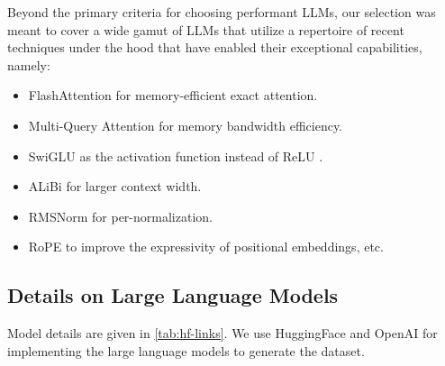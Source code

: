 Beyond the primary criteria for choosing performant LLMs, our selection was meant to cover a wide gamut of LLMs that utilize a repertoire of recent techniques under the hood that have enabled their exceptional capabilities, namely: 

\vspace{-2mm}
\begin{itemize}
[leftmargin=10mm]
\setlength\itemsep{0em}
\item FlashAttention \cite{dao2022flashattention} for memory-efficient exact attention.
\item Multi-Query Attention \cite{shazeer2019fast} for memory bandwidth efficiency.
\item SwiGLU \cite{shazeer2020glu} as the activation function instead of ReLU \cite{agarap2019deep}.
\item ALiBi \cite{DBLP:conf/iclr/PressSL22} for larger context width.
\item RMSNorm \cite{zhang2019root} for per-normalization.
\item RoPE \cite{su2022roformer} to improve the expressivity of positional embeddings, etc.
\end{itemize}


\subsection{Details on Large Language Models}
Model details are given in \cref{tab:hf-links}. We use HuggingFace \cite{wolf2020huggingfaces} and OpenAI for implementing the large language models to generate the dataset.


